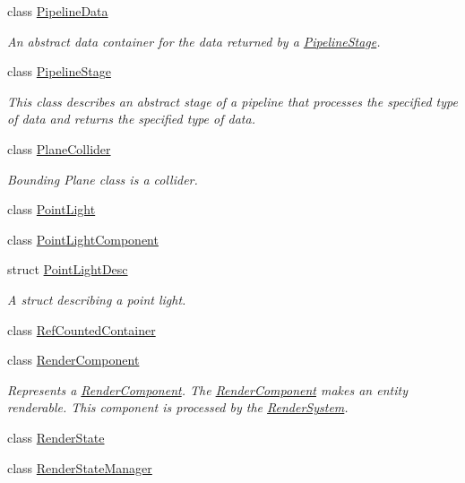 \begin{DoxyCompactItemize}
class \hyperlink{class_blade_1_1_pipeline_data}{Pipeline\+Data}
\begin{DoxyCompactList}\small\item\em An abstract data container for the data returned by a \hyperlink{class_blade_1_1_pipeline_stage}{Pipeline\+Stage}. \end{DoxyCompactList}\item 
class \hyperlink{class_blade_1_1_pipeline_stage}{Pipeline\+Stage}
\begin{DoxyCompactList}\small\item\em This class describes an abstract stage of a pipeline that processes the specified type of data and returns the specified type of data. \end{DoxyCompactList}\item 
class \hyperlink{class_blade_1_1_plane_collider}{Plane\+Collider}
\begin{DoxyCompactList}\small\item\em Bounding Plane class is a collider. \end{DoxyCompactList}\item 
class \hyperlink{class_blade_1_1_point_light}{Point\+Light}
\item 
class \hyperlink{class_blade_1_1_point_light_component}{Point\+Light\+Component}
\item 
struct \hyperlink{struct_blade_1_1_point_light_desc}{Point\+Light\+Desc}
\begin{DoxyCompactList}\small\item\em A struct describing a point light. \end{DoxyCompactList}\item 
class \hyperlink{class_blade_1_1_ref_counted_container}{Ref\+Counted\+Container}
\item 
class \hyperlink{class_blade_1_1_render_component}{Render\+Component}
\begin{DoxyCompactList}\small\item\em Represents a \hyperlink{class_blade_1_1_render_component}{Render\+Component}. The \hyperlink{class_blade_1_1_render_component}{Render\+Component} makes an entity renderable. This component is processed by the \hyperlink{class_blade_1_1_render_system}{Render\+System}. \end{DoxyCompactList}\item 
class \hyperlink{class_blade_1_1_render_state}{Render\+State}
\item 
class \hyperlink{class_blade_1_1_render_state_manager}{Render\+State\+Manager}

\end{DoxyCompactItemize}
